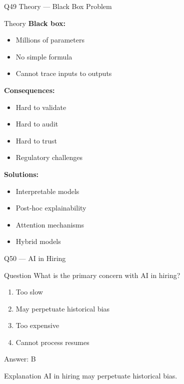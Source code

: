 \documentclass[aspectratio=169,8pt]{beamer}
\begin{document}
	\begin{frame}{Q49 Theory --- Black Box Problem}
		\begin{block}{Theory}
			\textbf{Black box:}
			\begin{itemize}
				\item Millions of parameters
				\item No simple formula
				\item Cannot trace inputs to outputs
			\end{itemize}
			\textbf{Consequences:}
			\begin{itemize}
				\item Hard to validate
				\item Hard to audit
				\item Hard to trust
				\item Regulatory challenges
			\end{itemize}
			\textbf{Solutions:}
			\begin{itemize}
				\item Interpretable models
				\item Post-hoc explainability
				\item Attention mechanisms
				\item Hybrid models
			\end{itemize}
		\end{block}
	\end{frame}
	
	\begin{frame}{Q50 --- AI in Hiring}
		\begin{block}{Question}
			What is the primary concern with AI in hiring?
		\end{block}
		\begin{enumerate}[label=\Alph*.]
			\item Too slow
			\item May perpetuate historical bias
			\item Too expensive
			\item Cannot process resumes
		\end{enumerate}
		\begin{exampleblock}{Answer: B}
		\end{exampleblock}
		\begin{block}{Explanation}
			AI in hiring may perpetuate historical bias.
		\end{block}
	\end{frame}
	
\end{document}
